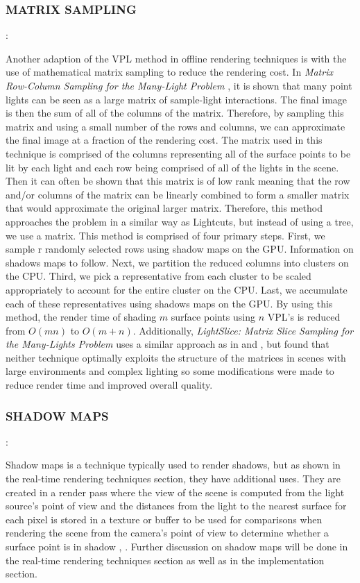 \subsubsection{MATRIX SAMPLING}: 

Another adaption of the VPL method in offline rendering techniques is with the use of mathematical matrix sampling to reduce the rendering cost.  In \textit{Matrix Row-Column Sampling for the Many-Light Problem} \cite{Havsan2007}, it is shown that many point lights can be seen as a large matrix of sample-light interactions.  The final image is then the sum of all of the columns of the matrix.  Therefore, by sampling this matrix and using a small number of the rows and columns, we can approximate the final image at a fraction of the rendering cost.  The matrix used in this technique is comprised of the columns representing all of the surface points to be lit by each light and each row being comprised of all of the lights in the scene.  Then it can often be shown that this matrix is of low rank meaning that the row and/or columns of the matrix can be linearly combined to form a smaller matrix that would approximate the original larger matrix.  Therefore, this method approaches the problem in a similar way as Lightcuts, but instead of using a tree, we use a matrix.  This method is comprised of four primary steps.  First, we sample r randomly selected rows using shadow maps on the GPU.  Information on shadows maps to follow.  Next, we partition the reduced columns into clusters on the CPU.  Third, we pick a representative from each cluster to be scaled appropriately to account for the entire cluster on the CPU.  Last, we accumulate each of these representatives using shadows maps on the GPU.  By using this method, the render time of shading $m$ surface points using $n$ VPL's is reduced from $O(mn)$ to $O(m+n)$.  Additionally, \textit{LightSlice: Matrix Slice Sampling for the Many-Lights Problem} \cite{Ou2011} uses a similar approach as in \cite{Havsan2007} and \cite{Walter2005}, but found that neither technique optimally exploits the structure of the matrices in scenes with large environments and complex lighting so some modifications were made to reduce render time and improved overall quality.

\subsubsection{SHADOW MAPS}: 

Shadow maps is a technique typically used to render shadows, but as shown in the real-time rendering techniques section, they have additional uses.  They are created in a render pass where the view of the scene is computed from the light source's point of view and the distances from the light to the nearest surface for each pixel is stored in a texture or buffer to be used for comparisons when rendering the scene from the camera's point of view to determine whether a surface point is in shadow \cite{Williams1978}, \cite{Reeves1987}.  Further discussion on shadow maps will be done in the real-time rendering techniques section as well as in the implementation section.

